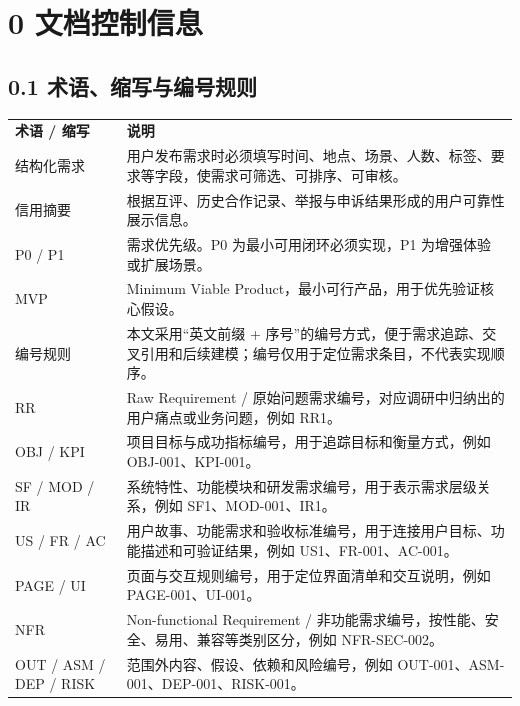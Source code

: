 \chapter{0 文档控制信息}\label{ux6587ux6863ux63a7ux5236ux4fe1ux606f}

\section{0.1 术语、缩写与编号规则}\label{ux672fux8bedux7f29ux5199ux4e0eux7f16ux53f7ux89c4ux5219}

{\def\LTcaptype{none} %
\begin{xltabular}{\textwidth}{@{}>{\centering\arraybackslash}X>{\centering\arraybackslash}X@{}}
\toprule\noalign{}
\endhead
\bottomrule\noalign{}
\endlastfoot
\textbf{术语 / 缩写} & \textbf{说明} \\
结构化需求 &
用户发布需求时必须填写时间、地点、场景、人数、标签、要求等字段，使需求可筛选、可排序、可审核。 \\
信用摘要 &
根据互评、历史合作记录、举报与申诉结果形成的用户可靠性展示信息。 \\
P0 / P1 & 需求优先级。P0 为最小可用闭环必须实现，P1
为增强体验或扩展场景。 \\
MVP & Minimum Viable Product，最小可行产品，用于优先验证核心假设。 \\
编号规则 & 本文采用``英文前缀 +
序号''的编号方式，便于需求追踪、交叉引用和后续建模；编号仅用于定位需求条目，不代表实现顺序。 \\
RR & Raw Requirement /
原始问题需求编号，对应调研中归纳出的用户痛点或业务问题，例如 RR1。 \\
OBJ / KPI & 项目目标与成功指标编号，用于追踪目标和衡量方式，例如
OBJ-001、KPI-001。 \\
SF / MOD / IR &
系统特性、功能模块和研发需求编号，用于表示需求层级关系，例如
SF1、MOD-001、IR1。 \\
US / FR / AC &
用户故事、功能需求和验收标准编号，用于连接用户目标、功能描述和可验证结果，例如
US1、FR-001、AC-001。 \\
PAGE / UI & 页面与交互规则编号，用于定位界面清单和交互说明，例如
PAGE-001、UI-001。 \\
NFR & Non-functional Requirement /
非功能需求编号，按性能、安全、易用、兼容等类别区分，例如
NFR-SEC-002。 \\
OUT / ASM / DEP / RISK & 范围外内容、假设、依赖和风险编号，例如
OUT-001、ASM-001、DEP-001、RISK-001。 \\
\end{xltabular}
}

